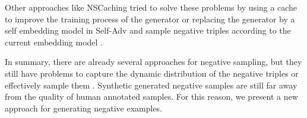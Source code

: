 Other approaches like \ac{NSCaching} tried to solve these problems by using a cache \cite{zhang2021efficient} to improve the training process of the generator or replacing the generator by a self embedding model in \ac{Self-Adv} and sample negative triples according to the current embedding model \cite{Self-Adv}.
    
In summary, there are already several approaches for negative sampling, but they still have problems to capture the dynamic distribution of the negative triples or effectively sample them \cite{zhang2021efficient}.
Synthetic generated negative samples are still far away from the quality of human annotated samples.
For this reason, we present a new approach for generating negative examples.






